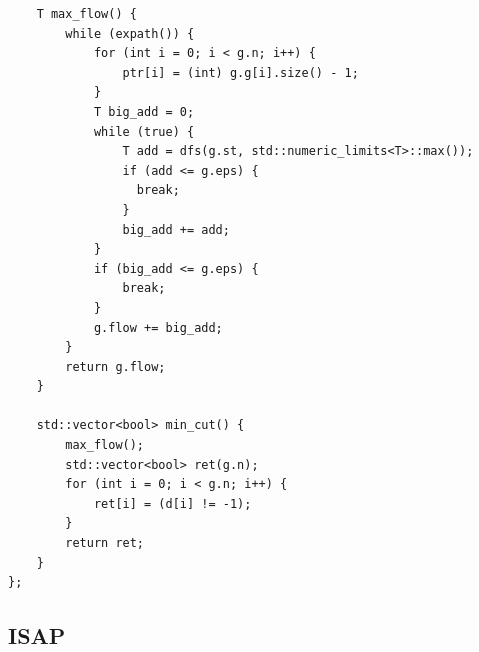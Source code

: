 \documentclass[twoside]{article}
\begin{document}
\begin{lstlisting}
    T max_flow() {
        while (expath()) {
            for (int i = 0; i < g.n; i++) {
                ptr[i] = (int) g.g[i].size() - 1;
            }
            T big_add = 0;
            while (true) {
                T add = dfs(g.st, std::numeric_limits<T>::max());
                if (add <= g.eps) {
                  break;
                }
                big_add += add;
            }
            if (big_add <= g.eps) {
                break;
            }
            g.flow += big_add;
        }
        return g.flow;
    }

    std::vector<bool> min_cut() {
        max_flow();
        std::vector<bool> ret(g.n);
        for (int i = 0; i < g.n; i++) {
            ret[i] = (d[i] != -1);
        }
        return ret;
    }
};\end{lstlisting}
\subsection{ISAP}
\end{document}
